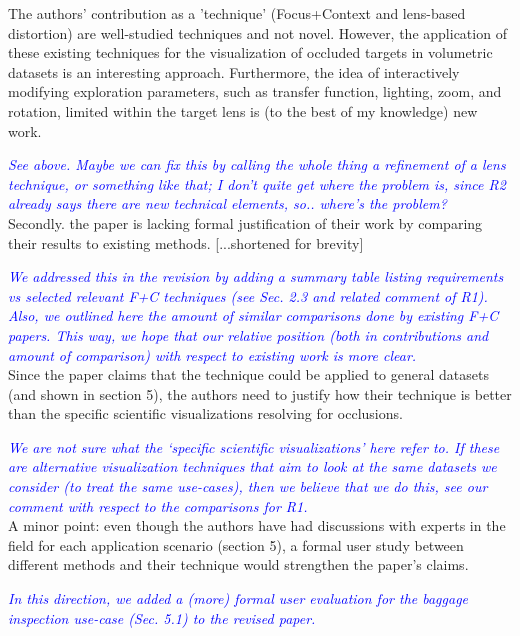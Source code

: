 \documentclass[a4paper,10pt]{article}
\newcommand{\rr}[1]{\emph{\textcolor{blue}{#1}}}
\begin{document}
    The authors' contribution as a 'technique' (Focus+Context and lens-based
    distortion) are well-studied techniques and not novel. However, the application of
    these existing techniques for the visualization of occluded targets in volumetric
    datasets is an interesting approach. Furthermore, the idea of interactively
    modifying exploration parameters, such as transfer function, lighting, zoom, and
    rotation, limited within the target lens is (to the best of my knowledge) new
    work.
    
    \rr{See above. Maybe we can fix this by calling the whole thing a refinement of a lens technique, or something like that; I don't quite get where the problem is, since R2 already says there are new technical elements, so.. where's the problem?}\\

    Secondly. the paper is lacking formal justification of their work by comparing
    their results to existing methods. [...shortened for brevity]
    
    \rr{We addressed this in the revision by adding a summary table listing requirements \emph{vs} selected relevant F+C techniques (see Sec. 2.3 and related comment of R1). Also, we outlined here the amount of similar comparisons done by existing F+C papers. This way, we hope that our relative position (both in contributions and amount of comparison) with respect to existing work is more clear.}\\
    
    Since the paper claims that the technique could be applied to
    general datasets (and shown in section 5), the authors need to justify how their
    technique is better than the specific scientific visualizations resolving for
    occlusions.
    
    \rr{We are not sure what the `specific scientific visualizations' here refer to. If these are alternative visualization techniques that aim to look at the same datasets we consider (to treat the same use-cases), then we believe that we do this, see our comment with respect to the comparisons for R1.}\\
    
    A minor point: even though the authors have had discussions with experts in the
    field for each application scenario (section 5), a formal user study between
    different methods and their technique would strengthen the paper's claims.
    
    \rr{In this direction, we added a (more) formal user evaluation for the baggage inspection use-case (Sec. 5.1) to the revised paper.}\\
\end{document}
